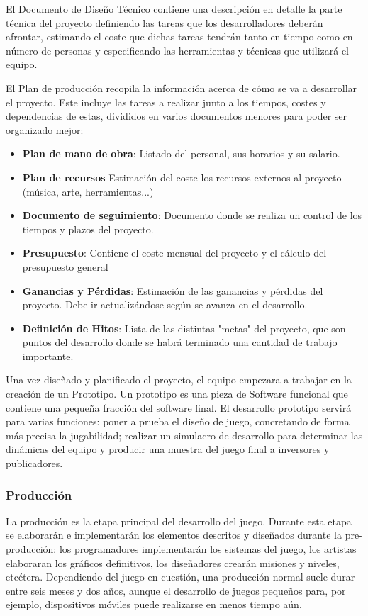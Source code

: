 El Documento de Diseño Técnico contiene una descripción en detalle la parte técnica del proyecto definiendo las tareas que los desarrolladores deberán afrontar, estimando el coste que dichas tareas tendrán tanto en tiempo como en número de personas y especificando las herramientas y técnicas que utilizará el equipo.

El Plan de producción recopila la información acerca de cómo se va a desarrollar el proyecto. Este incluye las tareas a realizar junto a los tiempos, costes y dependencias de estas, divididos en varios documentos menores para poder ser organizado mejor:
\begin{itemize}
\item \textbf{Plan de mano de obra}: Listado del personal, sus horarios y su salario.
\item \textbf{Plan de recursos} Estimación del coste los recursos externos al proyecto (música, arte, herramientas...)
\item \textbf{Documento de seguimiento}: Documento donde se realiza un control de los tiempos y plazos del proyecto.
\item \textbf{Presupuesto}: Contiene el coste mensual del proyecto y el cálculo del presupuesto general
\item \textbf{Ganancias y Pérdidas}: Estimación  de las ganancias y  pérdidas del proyecto. Debe ir actualizándose según se avanza en el desarrollo.
\item \textbf{Definición de Hitos}: Lista de las distintas "metas" del proyecto, que son puntos del desarrollo donde se habrá terminado una cantidad de trabajo importante.
\end{itemize}

Una vez diseñado y planificado el proyecto, el equipo empezara a trabajar en la creación de un Prototipo. Un prototipo es una pieza de Software funcional que contiene una pequeña fracción del software final. El desarrollo prototipo servirá para varias funciones: poner a prueba el diseño de juego, concretando de forma más precisa la jugabilidad; realizar un simulacro de desarrollo para determinar las dinámicas del equipo y producir una muestra del juego final a inversores y publicadores.

\subsubsection{Producción}
La producción es la etapa principal del desarrollo del juego. Durante esta etapa se elaborarán e implementarán los elementos descritos y diseñados durante la pre-producción: los programadores implementarán los sistemas del juego, los artistas elaboraran los gráficos definitivos, los diseñadores crearán misiones y niveles, etcétera. Dependiendo del juego en cuestión, una producción normal suele durar entre seis meses y dos años, aunque el desarrollo de juegos pequeños para, por ejemplo, dispositivos móviles puede realizarse en menos tiempo aún.


